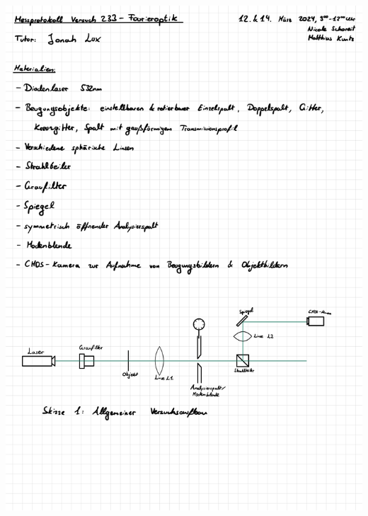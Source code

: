 \documentclass{article}
\begin{document}
\includegraphics[width=\textwidth]{graphics/messprotokoll/233 - Fourieroptik-3.jpg}
\newpage
\end{document}
